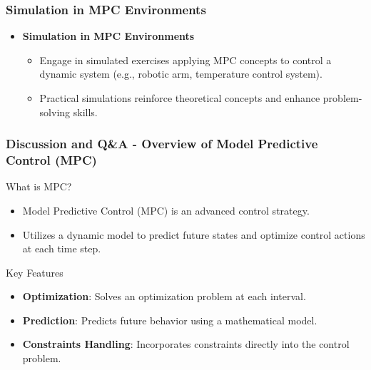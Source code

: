 \documentclass[aspectratio=169]{beamer}
\begin{document}
\begin{frame}[fragile]
    \frametitle{Simulation in MPC Environments}
    \begin{itemize}
        \item \textbf{Simulation in MPC Environments}
        \begin{itemize}
            \item Engage in simulated exercises applying MPC concepts to control a dynamic system (e.g., robotic arm, temperature control system).
            \item Practical simulations reinforce theoretical concepts and enhance problem-solving skills.
        \end{itemize}
    \end{itemize}
\end{frame}

\begin{frame}[fragile]
    \frametitle{Discussion and Q\&A - Overview of Model Predictive Control (MPC)}
    \begin{block}{What is MPC?}
        \begin{itemize}
            \item Model Predictive Control (MPC) is an advanced control strategy.
            \item Utilizes a dynamic model to predict future states and optimize control actions at each time step.
        \end{itemize}
    \end{block}
    
    \begin{block}{Key Features}
        \begin{itemize}
            \item \textbf{Optimization}: Solves an optimization problem at each interval.
            \item \textbf{Prediction}: Predicts future behavior using a mathematical model.
            \item \textbf{Constraints Handling}: Incorporates constraints directly into the control problem.
        \end{itemize}
    \end{block}
\end{frame}
\end{document}
